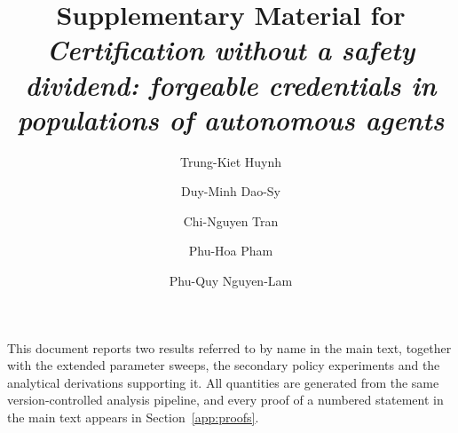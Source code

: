 \documentclass[11pt,a4paper]{article}
\title{Supplementary Material for\\
\emph{Certification without a safety dividend: forgeable credentials in
populations of autonomous agents}}
\author{Trung-Kiet Huynh \and Duy-Minh Dao-Sy \and Chi-Nguyen Tran \and
Phu-Hoa Pham \and Phu-Quy Nguyen-Lam}
\date{}
\begin{document}
\maketitle

This document reports two results referred to by name in the main text,
together with the extended parameter sweeps, the secondary policy experiments
and the analytical derivations supporting it. All quantities are generated from
the same version-controlled analysis pipeline, and every proof of a numbered
statement in the main text appears in Section~\ref{app:proofs}.
\end{document}
